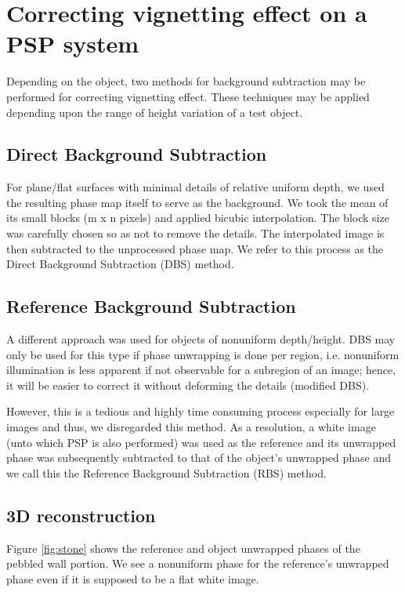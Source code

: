 \section{Correcting vignetting effect on a PSP system}

Depending on the object, two methods for background subtraction may be performed for correcting vignetting effect. These techniques may be applied depending upon the range of height variation of a test object. 

\subsection{Direct Background Subtraction}

For plane/flat surfaces with minimal details of relative uniform depth, we used the resulting phase map itself to serve as the background. 
We took the mean of its small blocks (m x n pixels) and applied bicubic interpolation. The block size was carefully chosen so as not to remove the details.
The interpolated image is then subtracted to the unprocessed phase map. We refer to this process as the Direct Background Subtraction (DBS) method.

\subsection{Reference Background Subtraction}

A different approach was used for objects of nonuniform depth/height. 
DBS may only be used for this type if phase unwrapping is done per region, i.e. nonuniform illumination is less apparent if not observable for a subregion of an image; hence, it will be easier to correct it without deforming the details (modified DBS).

However, this is a tedious and highly time consuming process especially for large images and thus, we disregarded this method. As a resolution, a white image (unto which PSP is also performed) was used as the reference and its unwrapped phase was subsequently subtracted to that of the object's unwrapped phase and we call this the Reference Background Subtraction (RBS) method.

\subsection{3D reconstruction}
Figure \ref{fig:stone} shows the reference and object unwrapped phases of the pebbled wall portion. 
We see a nonuniform phase for the reference's unwrapped phase even if it is supposed to be a flat white image.

